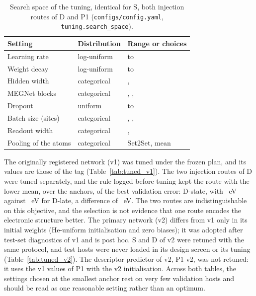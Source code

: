\begin{table}[htbp]
\caption{Search space of the tuning, identical for S, both injection routes of D and P1
(\texttt{configs/config.yaml}, \texttt{tuning.search\_space}).}
\label{tab:space}
\centering\small
\begin{tabular}{@{}lll@{}}
\toprule
Setting & Distribution & Range or choices \\
\midrule
Learning rate & log-uniform & \numCfgTuningSearchSpaceLearningRateLow{} to \numCfgTuningSearchSpaceLearningRateHigh{} \\
Weight decay & log-uniform & \numCfgTuningSearchSpaceWeightDecayLow{} to \numCfgTuningSearchSpaceWeightDecayHigh{} \\
Hidden width & categorical & \numCfgTuningSearchSpaceHiddenWidthChoicesItemOne{}, \numCfgTuningSearchSpaceHiddenWidthChoicesItemTwo{} \\
MEGNet blocks & categorical & \numCfgTuningSearchSpaceMegnetBlocksChoicesItemOne{}, \numCfgTuningSearchSpaceMegnetBlocksChoicesItemTwo{}, \numCfgTuningSearchSpaceMegnetBlocksChoicesItemThree{} \\
Dropout & uniform & \numCfgTuningSearchSpaceDropoutLow{} to \numCfgTuningSearchSpaceDropoutHigh{} \\
Batch size (sites) & categorical & \numCfgTuningSearchSpaceBatchSizeChoicesItemOne{}, \numCfgTuningSearchSpaceBatchSizeChoicesItemTwo{}, \numCfgTuningSearchSpaceBatchSizeChoicesItemThree{} \\
Readout width & categorical & \numCfgTuningSearchSpaceReadoutMlpWidthChoicesItemOne{}, \numCfgTuningSearchSpaceReadoutMlpWidthChoicesItemTwo{} \\
Pooling of the atoms & categorical & Set2Set, mean \\
\bottomrule
\end{tabular}
\end{table}

The originally registered network (v1) was tuned under the frozen plan, and its values are those of the tag
\tagtuned{} (Table~\ref{tab:tuned_v1}). The two injection routes of D were tuned separately, and the rule logged
before tuning kept the route with the lower mean, over the anchors, of the best validation error: D-state, with
\numTuningSummaryDecisionMeansEVDState{}~eV against \numTuningSummaryDecisionMeansEVDLate{}~eV for D-late, a
difference of \numTuningSummaryDecisionDifferenceEV{}~eV. The two routes are indistinguishable on this objective,
and the selection is not evidence that one route encodes the electronic structure better. The primary network
(v2) differs from v1 only in its initial weights (He-uniform initialisation and zero biases); it was adopted after
test-set diagnostics of v1 and is post hoc. S and D of v2 were retuned with the same protocol, and test hosts were
never loaded in its design screen or its tuning (Table~\ref{tab:tuned_v2}). The descriptor predictor of v2, P1-v2,
was not retuned: it uses the v1 values of P1 with the v2 initialisation. Across both tables, the settings chosen at
the smallest anchor rest on very few validation hosts and should be read as one reasonable setting rather than
an optimum.

